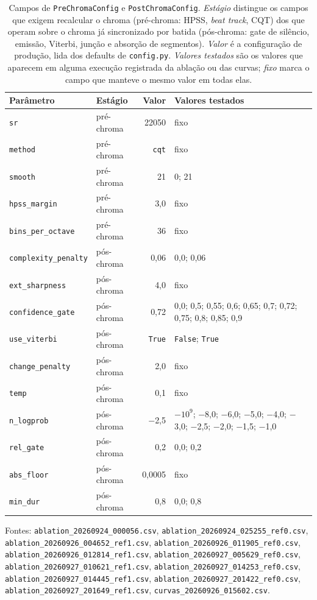 \begin{table}[t]
  \centering
  \caption{Campos de \texttt{PreChromaConfig} e \texttt{PostChromaConfig}. \emph{Estágio} distingue os campos que exigem recalcular o chroma (pré-chroma: HPSS, \emph{beat track}, CQT) dos que operam sobre o chroma já sincronizado por batida (pós-chroma: gate de silêncio, emissão, Viterbi, junção e absorção de segmentos). \emph{Valor} é a configuração de produção, lida dos defaults de \texttt{config.py}. \emph{Valores testados} são os valores que aparecem em alguma execução registrada da ablação ou das curvas; \emph{fixo} marca o campo que manteve o mesmo valor em todas elas.}
  \label{tab:config}
  \footnotesize
  \begin{tabular}{llrl}
    \toprule
    Parâmetro & Estágio & Valor & Valores testados \\
    \midrule
    \texttt{sr} & pré-chroma & 22050 & fixo \\
    \texttt{method} & pré-chroma & \texttt{cqt} & fixo \\
    \texttt{smooth} & pré-chroma & 21 & 0; 21 \\
    \texttt{hpss\_margin} & pré-chroma & 3,0 & fixo \\
    \texttt{bins\_per\_octave} & pré-chroma & 36 & fixo \\
    \texttt{complexity\_penalty} & pós-chroma & 0,06 & 0,0; 0,06 \\
    \texttt{ext\_sharpness} & pós-chroma & 4,0 & fixo \\
    \texttt{confidence\_gate} & pós-chroma & 0,72 & 0,0; 0,5; 0,55; 0,6; 0,65; 0,7; 0,72; 0,75; 0,8; 0,85; 0,9 \\
    \texttt{use\_viterbi} & pós-chroma & \texttt{True} & \texttt{False}; \texttt{True} \\
    \texttt{change\_penalty} & pós-chroma & 2,0 & fixo \\
    \texttt{temp} & pós-chroma & 0,1 & fixo \\
    \texttt{n\_logprob} & pós-chroma & $-$2,5 & $-10^{9}$; $-$8,0; $-$6,0; $-$5,0; $-$4,0; $-$3,0; $-$2,5; $-$2,0; $-$1,5; $-$1,0 \\
    \texttt{rel\_gate} & pós-chroma & 0,2 & 0,0; 0,2 \\
    \texttt{abs\_floor} & pós-chroma & 0,0005 & fixo \\
    \texttt{min\_dur} & pós-chroma & 0,8 & 0,0; 0,8 \\
    \bottomrule
  \end{tabular}
  \vspace{2pt}
  \parbox{\linewidth}{\footnotesize Fontes: \texttt{ablation\_20260924\_000056.csv}, \texttt{ablation\_20260924\_025255\_ref0.csv}, \texttt{ablation\_20260926\_004652\_ref1.csv}, \texttt{ablation\_20260926\_011905\_ref0.csv}, \texttt{ablation\_20260926\_012814\_ref1.csv}, \texttt{ablation\_20260927\_005629\_ref0.csv}, \texttt{ablation\_20260927\_010621\_ref1.csv}, \texttt{ablation\_20260927\_014253\_ref0.csv}, \texttt{ablation\_20260927\_014445\_ref1.csv}, \texttt{ablation\_20260927\_201422\_ref0.csv}, \texttt{ablation\_20260927\_201649\_ref1.csv}, \texttt{curvas\_20260926\_015602.csv}.}
\end{table}
